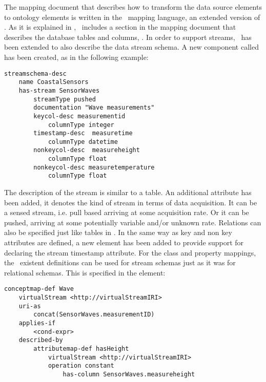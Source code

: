The mapping document that describes how to transform the data source elements to ontology elements is written in the
\stwoo\ mapping language, an extended version of \rtwoo. As it is explained in \cite{Barrasa_04}, \rtwoo\ includes a
section in the mapping document that describes the database tables and columns, . In order to
support streams, \rtwoo\ has been extended to also describe the data stream schema. A new component called
 has been created, as in the following example:

\begin{lstlisting}[style=R2OStyle,language=R2O,frame=none]
streamschema-desc
    name CoastalSensors
    has-stream SensorWaves
        streamType pushed
        documentation "Wave measurements"
        keycol-desc measurementid
            columnType integer
        timestamp-desc  measuretime
            columnType datetime
        nonkeycol-desc  measureheight
            columnType float
        nonkeycol-desc measuretemperature
            columnType float
\end{lstlisting}
The description of the stream is similar to a table. An additional attribute  has been added, it denotes the kind of stream in terms of data acquisition. It can be a sensed stream, i.e. pull based arriving at some acquisition rate. Or it can be pushed, arriving at some potentially variable and/or unknown rate. Relations can also be specified just like tables in \stwoo. In the same way as key and non key attributes are defined, a new  element has been added to provide support for declaring the stream timestamp attribute.
For the class and property mappings, the \rtwoo\ existent definitions can be used for stream schemas just as it was for relational schemas. This is specified in the  element:
\begin{lstlisting}[style=R2OStyle,language=R2O,frame=none]
conceptmap-def Wave
    virtualStream <http://virtualStreamIRI>
    uri-as
        concat(SensorWaves.measurementID)
    applies-if
        <cond-expr>
    described-by
        attributemap-def hasHeight
            virtualStream <http://virtualStreamIRI>
            operation constant
                has-column SensorWaves.measureheight
\end{lstlisting}
